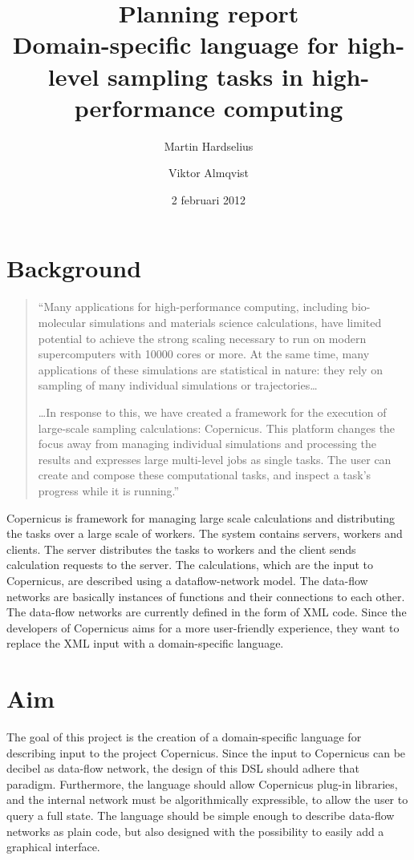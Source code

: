 \documentclass[a4paper]{article}
\title{Planning report\\
  \large{Domain-specific language for high-level
  sampling tasks in high-performance computing
  }
}
\author{Martin Hardselius \and Viktor Almqvist}
\date{2 februari 2012}
\begin{document}
\maketitle
\newpage

\section{Background}
\begin{quotation}
  ``Many applications for high-performance computing, including
  bio-molecular simulations and materials science calculations, have
  limited potential to achieve the strong scaling necessary to run on
  modern supercomputers with 10000 cores or more. At the same time,
  many applications of these simulations are statistical in nature:
  they rely on sampling of many individual simulations or
  trajectories\ldots

  \ldots In response to this, we have created a framework for the
  execution of large-scale sampling calculations: Copernicus. This
  platform changes the focus away from managing individual simulations
  and processing the results and expresses large multi-level jobs as
  single tasks. The user can create and compose these computational
  tasks, and inspect a task's progress while it is running.''
\end{quotation}

Copernicus is framework for managing large scale calculations and
distributing the tasks over a large scale of workers. The system
contains servers, workers and clients. The server distributes the
tasks to workers and the client sends calculation requests to the
server. The calculations, which are the input to Copernicus, are
described using a dataflow-network model. The data-flow networks are
basically instances of functions and their connections to each
other. The data-flow networks are currently defined in the form of XML
code. Since the developers of Copernicus aims for a more user-friendly
experience, they want to replace the XML input with a domain-specific
language.

\section{Aim}
The goal of this project is the creation of a domain-specific language
for describing input to the project Copernicus. Since the input to
Copernicus can be decibel as data-flow network, the design of this
DSL should adhere that paradigm. Furthermore, the language should
allow Copernicus plug-in libraries, and the internal network must be
algorithmically expressible, to allow the user to query a full
state. The language should be simple enough to describe data-flow
networks as plain code, but also designed with the possibility to
easily add a graphical interface.
\end{document}
